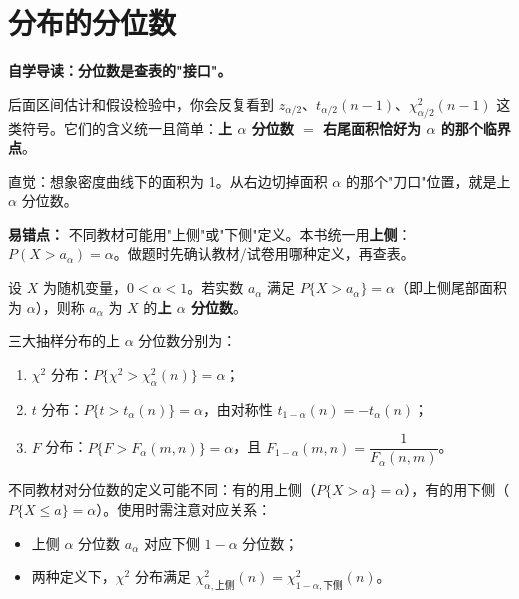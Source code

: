 ﻿\documentclass[lang=cn,11pt]{elegantbook}
\begin{document}
\section{分布的分位数}

\begin{note}
\textbf{自学导读：分位数是查表的"接口"。}

后面区间估计和假设检验中，你会反复看到 $z_{\alpha/2}$、$t_{\alpha/2}(n-1)$、$\chi^2_{\alpha/2}(n-1)$ 这类符号。它们的含义统一且简单：\textbf{上 $\alpha$ 分位数 $=$ 右尾面积恰好为 $\alpha$ 的那个临界点}。

直觉：想象密度曲线下的面积为 1。从右边切掉面积 $\alpha$ 的那个"刀口"位置，就是上 $\alpha$ 分位数。

\textbf{易错点：} 不同教材可能用"上侧"或"下侧"定义。本书统一用\textbf{上侧}：$P(X>a_\alpha)=\alpha$。做题时先确认教材/试卷用哪种定义，再查表。
\end{note}

\begin{definition} \label{def:quantile}
设 \(X\) 为随机变量，\(0 < \alpha < 1\)。若实数 \(a_\alpha\) 满足 \(P\{X > a_\alpha\} = \alpha\)（即上侧尾部面积为 \(\alpha\)），则称 \(a_\alpha\) 为 \(X\) 的\textbf{上 \(\alpha\) 分位数}。
\end{definition}

三大抽样分布的上 \(\alpha\) 分位数分别为：
\begin{enumerate}
    \item \(\chi^2\) 分布：\(P\{\chi^2 > \chi_\alpha^2(n)\} = \alpha\)；
    \item \(t\) 分布：\(P\{t > t_\alpha(n)\} = \alpha\)，由对称性 \(t_{1-\alpha}(n) = -t_\alpha(n)\)；
    \item \(F\) 分布：\(P\{F > F_\alpha(m,n)\} = \alpha\)，且 \(F_{1-\alpha}(m,n) = \dfrac{1}{F_\alpha(n,m)}\)。
\end{enumerate}

\begin{note}
不同教材对分位数的定义可能不同：有的用上侧（\(P\{X > a\} = \alpha\)），有的用下侧（\(P\{X \leq a\} = \alpha\)）。使用时需注意对应关系：
\begin{itemize}
    \item 上侧 \(\alpha\) 分位数 \(a_\alpha\) 对应下侧 \(1-\alpha\) 分位数；
    \item 两种定义下，\(\chi^2\) 分布满足 \(\chi^2_{\alpha,\text{上侧}}(n) = \chi^2_{1-\alpha,\text{下侧}}(n)\)。
\end{itemize}
\end{note}
\end{document}
